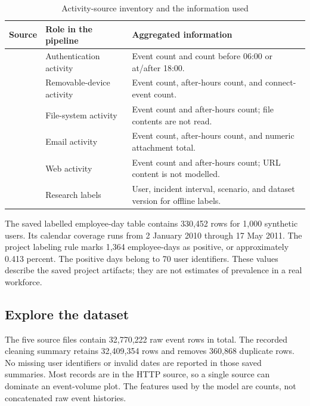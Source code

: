 \begin{table}[H]
\centering
\tablefont
\caption{Activity-source inventory and the information used}
\label{tab:source-inventory}
\begin{tabularx}{\textwidth}{|p{}|p{}|Y|}
\hline
\textbf{Source} & \textbf{Role in the pipeline} & \textbf{Aggregated information}\\\hline
{} & Authentication activity & Event count and count before 06:00 or at/after 18:00.\\\hline
{} & Removable-device activity & Event count, after-hours count, and connect-event count.\\\hline
{} & File-system activity & Event count and after-hours count; file contents are not read.\\\hline
{} & Email activity & Event count, after-hours count, and numeric attachment total.\\\hline
{} & Web activity & Event count and after-hours count; URL content is not modelled.\\\hline
{} & Research labels & User, incident interval, scenario, and dataset version for offline labels.\\\hline
\end{tabularx}
\end{table}

The saved labelled employee-day table contains 330,452 rows for 1,000
synthetic users. Its calendar coverage runs from 2 January 2010 through
17 May 2011. The project labeling rule marks 1,364 employee-days as
positive, or approximately 0.413 percent. The positive days belong to
70 user identifiers. These values describe the saved project
artifacts; they are not estimates of prevalence in a real workforce.

\subsection{Explore the dataset}
The five source files contain 32,770,222 raw event rows in total.
The recorded cleaning summary retains 32,409,354 rows and removes
360,868 duplicate rows. No missing user identifiers or invalid dates
are reported in those saved summaries. Most records are in the HTTP
source, so a single source can dominate an event-volume plot. The
features used by the model are counts, not concatenated raw event
histories.

